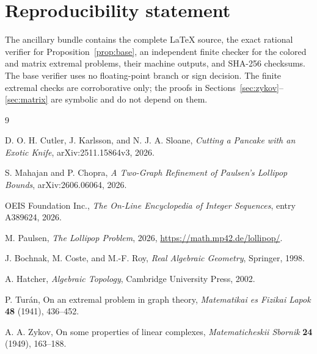 \documentclass[11pt]{article}
\theoremstyle{plain}
\theoremstyle{definition}
\theoremstyle{remark}
\newcommand{\1}{\mathbf 1}
\begin{document}
\section*{Reproducibility statement}

The ancillary bundle contains the complete \LaTeX{} source, the exact
rational verifier for Proposition~\ref{prop:base}, an independent finite
checker for the colored and matrix extremal problems, their machine outputs,
and SHA-256 checksums.  The base verifier uses no floating-point branch or sign
decision.  The finite extremal checks are corroborative only; the proofs in
Sections~\ref{sec:zykov}--\ref{sec:matrix} are symbolic and do not depend on
them.

\begin{thebibliography}{9}

D. O. H. Cutler, J. Karlsson, and N. J. A. Sloane,
\emph{Cutting a Pancake with an Exotic Knife},
arXiv:2511.15864v3, 2026.

S. Mahajan and P. Chopra,
\emph{A Two-Graph Refinement of Paulsen's Lollipop Bounds},
arXiv:2606.06064, 2026.

OEIS Foundation Inc.,
\emph{The On-Line Encyclopedia of Integer Sequences}, entry A389624,
2026.

M. Paulsen,
\emph{The Lollipop Problem}, 2026,
\url{https://math.mp42.de/lollipop/}.


J. Bochnak, M. Coste, and M.-F. Roy,
\emph{Real Algebraic Geometry}, Springer, 1998.

A. Hatcher,
\emph{Algebraic Topology}, Cambridge University Press, 2002.

P. Tur\'an,
On an extremal problem in graph theory,
\emph{Matematikai es Fizikai Lapok} \textbf{48} (1941), 436--452.

A. A. Zykov,
On some properties of linear complexes,
\emph{Matematicheskii Sbornik} \textbf{24} (1949), 163--188.

\end{thebibliography}
\end{document}
